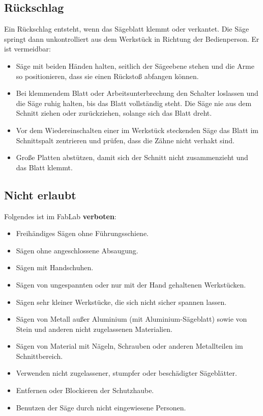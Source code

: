 \documentclass{\basedir/fablab-document}
\begin{document}
	\subsection{Rückschlag}
	Ein Rückschlag entsteht, wenn das Sägeblatt klemmt oder verkantet. Die Säge springt dann unkontrolliert aus dem Werkstück in Richtung der Bedienperson. Er ist vermeidbar:
	\begin{itemize}
		\item Säge mit beiden Händen halten, seitlich der Sägeebene stehen und die Arme so positionieren, dass sie einen Rückstoß abfangen können.
		\item Bei klemmendem Blatt oder Arbeitsunterbrechung den Schalter loslassen und die Säge ruhig halten, bis das Blatt vollständig steht. Die Säge nie aus dem Schnitt ziehen oder zurückziehen, solange sich das Blatt dreht.
		\item Vor dem Wiedereinschalten einer im Werkstück steckenden Säge das Blatt im Schnittspalt zentrieren und prüfen, dass die Zähne nicht verhakt sind.
		\item Große Platten abstützen, damit sich der Schnitt nicht zusammenzieht und das Blatt klemmt.
	\end{itemize}

	\subsection{Nicht erlaubt}
	Folgendes ist im FabLab \textbf{verboten}:
	\begin{itemize}
		\item Freihändiges Sägen ohne Führungsschiene.
		\item Sägen ohne angeschlossene Absaugung.
		\item Sägen mit Handschuhen.
		\item Sägen von ungespannten oder nur mit der Hand gehaltenen Werkstücken.
		\item Sägen sehr kleiner Werkstücke, die sich nicht sicher spannen lassen.
		\item Sägen von Metall außer Aluminium (mit Aluminium-Sägeblatt) sowie von Stein und anderen nicht zugelassenen Materialien.
		\item Sägen von Material mit Nägeln, Schrauben oder anderen Metallteilen im Schnittbereich.
		\item Verwenden nicht zugelassener, stumpfer oder beschädigter Sägeblätter.
		\item Entfernen oder Blockieren der Schutzhaube.
		\item Benutzen der Säge durch nicht eingewiesene Personen.
	\end{itemize}
\end{document}
